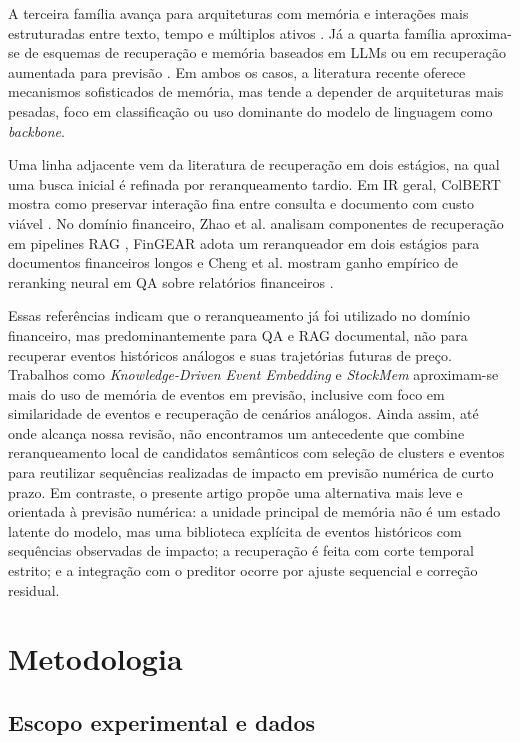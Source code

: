 \documentclass[12pt]{article}
\begin{document}
A terceira família avança para arquiteturas com memória e interações mais estruturadas entre texto, tempo e múltiplos ativos \cite{Luo:2023}. Já a quarta família aproxima-se de esquemas de recuperação e memória baseados em LLMs ou em recuperação aumentada para previsão \cite{Li:2025RAF, Xiao:2025FinSrag, Wang:2025StockMem}. Em ambos os casos, a literatura recente oferece mecanismos sofisticados de memória, mas tende a depender de arquiteturas mais pesadas, foco em classificação ou uso dominante do modelo de linguagem como \textit{backbone}.

Uma linha adjacente vem da literatura de recuperação em dois estágios, na qual uma busca inicial é refinada por reranqueamento tardio. Em IR geral, ColBERT mostra como preservar interação fina entre consulta e documento com custo viável \cite{Khattab:2020}. No domínio financeiro, Zhao et al. analisam componentes de recuperação em pipelines RAG \cite{Zhao:2024}, FinGEAR adota um reranqueador em dois estágios para documentos financeiros longos \cite{Li:2025FinGEAR} e Cheng et al. mostram ganho empírico de reranking neural em QA sobre relatórios financeiros \cite{Cheng:2026FinRerank}.

Essas referências indicam que o reranqueamento já foi utilizado no domínio financeiro, mas predominantemente para QA e RAG documental, não para recuperar eventos históricos análogos e suas trajetórias futuras de preço. Trabalhos como \textit{Knowledge-Driven Event Embedding} \cite{Ding:2016} e \textit{StockMem} \cite{Wang:2025StockMem} aproximam-se mais do uso de memória de eventos em previsão, inclusive com foco em similaridade de eventos e recuperação de cenários análogos. Ainda assim, até onde alcança nossa revisão, não encontramos um antecedente que combine reranqueamento local de candidatos semânticos com seleção de clusters e eventos para reutilizar sequências realizadas de impacto em previsão numérica de curto prazo. Em contraste, o presente artigo propõe uma alternativa mais leve e orientada à previsão numérica: a unidade principal de memória não é um estado latente do modelo, mas uma biblioteca explícita de eventos históricos com sequências observadas de impacto; a recuperação é feita com corte temporal estrito; e a integração com o preditor ocorre por ajuste sequencial e correção residual.

\section{Metodologia}

\subsection{Escopo experimental e dados}
\end{document}
